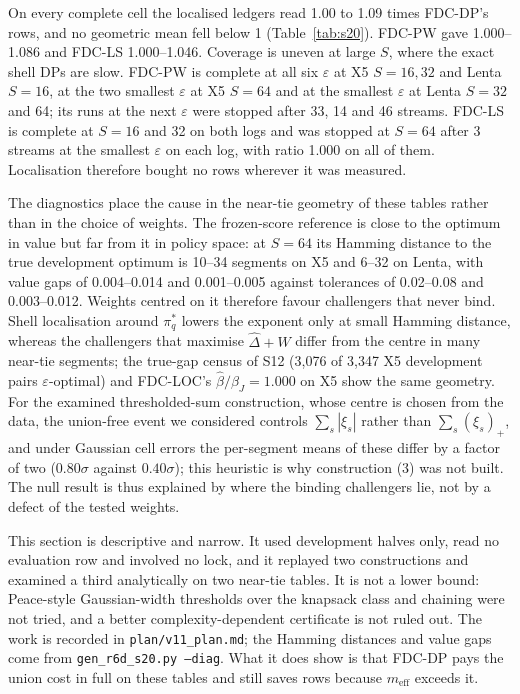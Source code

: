 \documentclass[sigconf,anonymous,review]{acmart}
\newcommand{\eps}{\varepsilon}
\newcommand{\meff}{m_{\text{eff}}}
\begin{document}
On every complete cell the localised ledgers read 1.00 to 1.09 times FDC-DP's rows, and no geometric mean fell below 1 (Table~\ref{tab:s20}). FDC-PW gave 1.000--1.086 and FDC-LS 1.000--1.046. Coverage is uneven at large $S$, where the exact shell DPs are slow. FDC-PW is complete at all six $\eps$ at X5 $S = 16, 32$ and Lenta $S = 16$, at the two smallest $\eps$ at X5 $S = 64$ and at the smallest $\eps$ at Lenta $S = 32$ and 64; its runs at the next $\eps$ were stopped after 33, 14 and 46 streams. FDC-LS is complete at $S = 16$ and 32 on both logs and was stopped at $S = 64$ after 3 streams at the smallest $\eps$ on each log, with ratio 1.000 on all of them. Localisation therefore bought no rows wherever it was measured.

The diagnostics place the cause in the near-tie geometry of these tables rather than in the choice of weights. The frozen-score reference is close to the optimum in value but far from it in policy space: at $S = 64$ its Hamming distance to the true development optimum is 10--34 segments on X5 and 6--32 on Lenta, with value gaps of 0.004--0.014 and 0.001--0.005 against tolerances of 0.02--0.08 and 0.003--0.012. Weights centred on it therefore favour challengers that never bind. Shell localisation around $\pi^*_q$ lowers the exponent only at small Hamming distance, whereas the challengers that maximise $\hat\Delta + W$ differ from the centre in many near-tie segments; the true-gap census of S12 (3,076 of 3,347 X5 development pairs $\eps$-optimal) and FDC-LOC's $\hat\beta/\beta_J = 1.000$ on X5 show the same geometry. For the examined thresholded-sum construction, whose centre is chosen from the data, the union-free event we considered controls $\sum_s |\xi_s|$ rather than $\sum_s (\xi_s)_+$, and under Gaussian cell errors the per-segment means of these differ by a factor of two ($0.80\sigma$ against $0.40\sigma$); this heuristic is why construction (3) was not built. The null result is thus explained by where the binding challengers lie, not by a defect of the tested weights.

This section is descriptive and narrow. It used development halves only, read no evaluation row and involved no lock, and it replayed two constructions and examined a third analytically on two near-tie tables. It is not a lower bound: Peace-style Gaussian-width thresholds over the knapsack class and chaining were not tried, and a better complexity-dependent certificate is not ruled out. The work is recorded in \texttt{plan/v11\_plan.md}; the Hamming distances and value gaps come from \texttt{gen\_r6d\_s20.py --diag}. What it does show is that FDC-DP pays the union cost in full on these tables and still saves rows because $\meff$ exceeds it.
\end{document}
